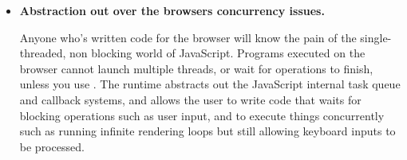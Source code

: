 \begin{itemize}
    \item \textbf{Abstraction out over the browsers concurrency issues.}
        
        Anyone who's written code for the browser will know the pain of the single-threaded, non blocking world of JavaScript. Programs executed on the browser cannot launch multiple threads, or wait for operations to finish, unless you use \Setanta{}. The \Setanta{} runtime abstracts out the JavaScript internal task queue and callback systems, and allows the user to write code that waits for blocking operations such as user input, and to execute things concurrently such as running infinite rendering loops but still allowing keyboard inputs to be processed.

\end{itemize}
